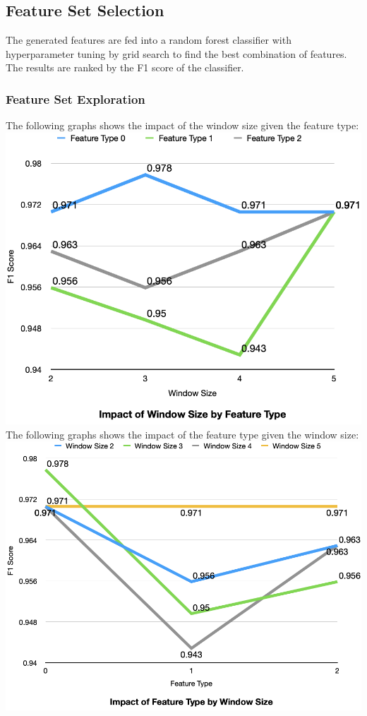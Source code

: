 \documentclass{article}
\begin{document}
    \subsection{Feature Set Selection}
    The generated features are fed into a random forest classifier with hyperparameter tuning by grid search to find the best combination of features.
    The results are ranked by the F1 score of the classifier. 
    \subsubsection{Feature Set Exploration}
    The following graphs shows the impact of the window size given the feature type:\\
    \includegraphics[width=13.4cm]{./by_feature.png}\\
    The following graphs shows the impact of the feature type given the window size:\\
    \includegraphics[width=13.4cm]{./by_window_size.png}\\
\end{document}
